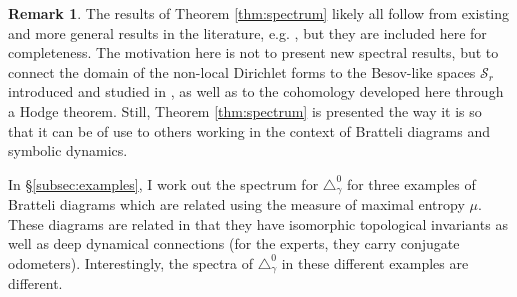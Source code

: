 \documentclass[12pt]{amsart}
\theoremstyle{plain}
\theoremstyle{definition}
\newtheorem{remark}{Remark}[section]
\begin{document}
\begin{remark}
\label{rem:results}
The results of Theorem \ref{thm:spectrum} likely all follow from existing and more general results in the literature, e.g. \cite{KK:wavelets, BK:hier, Bendikov:ultra, BGHH:HK, BP:ultra, JS:LaplacianTiling, HKL:DirGraph, GM:logLap, GGM:HeatCuntz, GM:QuantumMetrics}, but they are included here for completeness. The motivation here is not to present new spectral results, but to connect the domain of the non-local Dirichlet forms to the Besov-like spaces $\mathcal{S}_r$ introduced and studied in \cite{T:transversal, T:CohEq}, as well as to the cohomology developed here through a Hodge theorem. Still, Theorem \ref{thm:spectrum} is presented the way it is so that it can be of use to others working in the context of Bratteli diagrams and symbolic dynamics.
\end{remark}

In \S \ref{subsec:examples}, I work out the spectrum for $\triangle_\gamma^0$ for three examples of Bratteli diagrams which are related using the measure of maximal entropy $\mu$. These diagrams are related in that they have isomorphic topological invariants as well as deep dynamical connections (for the experts, they carry conjugate odometers). Interestingly, the spectra of $\triangle_\gamma^0$ in these different examples are different.
\end{document}
